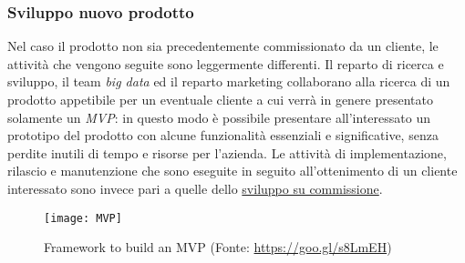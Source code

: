 \subsubsection{Sviluppo nuovo prodotto}
Nel caso il prodotto non sia precedentemente commissionato da un cliente, le attività che vengono seguite sono leggermente differenti. Il reparto di ricerca e sviluppo, il team \textit{big data} ed il reparto marketing collaborano alla ricerca di un prodotto appetibile per un eventuale cliente a cui verrà in genere presentato solamente un \textit{\gls{MVP}}: in questo modo è possibile presentare all'interessato un prototipo del prodotto con alcune funzionalità essenziali e significative, senza perdite inutili di tempo e risorse per l'azienda. Le attività di implementazione, rilascio e manutenzione che sono eseguite in seguito all'ottenimento di un cliente interessato sono invece pari a quelle dello \hyperref[commissione]{sviluppo su commissione}.
\begin{figure}[!h] 
	\centering 
	\texttt{[image: MVP]}
	\caption{Framework to build an MVP (Fonte: \href{https://goo.gl/s8LmEH}{https://goo.gl/s8LmEH})}
\end{figure}

